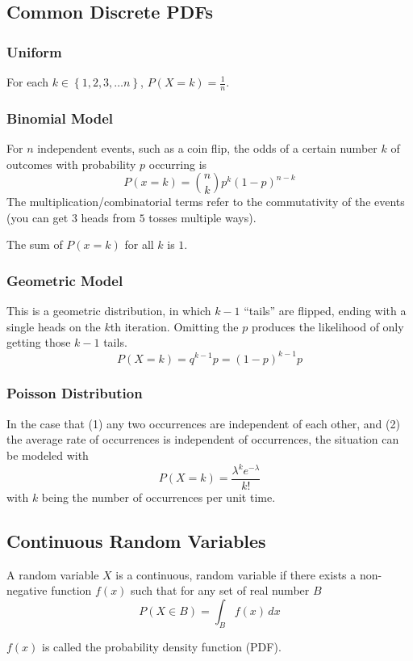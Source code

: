 \documentclass{article}
\begin{document}
\subsection{Common Discrete PDFs}
\subsubsection{Uniform} \label{uni}
For each $k\in\left\{1, 2, 3, \ldots n \right\}$, $P(X=k)=\frac{1}{n}$.

\subsubsection{Binomial Model}
For $n$ independent events, such as a coin flip, the odds of a certain number $k$ of outcomes with probability $p$ occurring is
$$P(x = k) = \binom{n}{k} p^k(1-p)^{n-k}$$
The multiplication/combinatorial terms refer to the commutativity of the events (you can get $3$ heads from $5$ tosses multiple ways).

The sum of $P(x=k)$ for all $k$ is $1$.

\subsubsection{Geometric Model}\label{geo}
This is a geometric distribution, in which $k-1$ ``tails'' are flipped, ending with a single heads on the $k$th iteration. Omitting the $p$ produces the likelihood of only getting those $k-1$ tails.
$$P(X=k)=q^{k-1}p = (1 - p)^{k-1}p$$

\subsubsection{Poisson Distribution}
In the case that (1) any two occurrences are independent of each other, and (2) the average rate of occurrences is independent of occurrences, the situation can be modeled with
$$P(X=k)=\frac{\lambda^ke^{-\lambda}}{k!}$$
with $k$ being the number of occurrences per unit time.

\subsection{Continuous Random Variables}
A random variable $X$ is a continuous, random variable if there exists a non-negative function $f(x)$ such that for any set of real number $B$
$$P(X \in B) = \int_B f(x)\,dx$$

$f(x)$ is called the probability density function (PDF).
\end{document}
